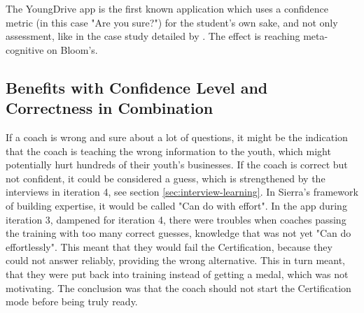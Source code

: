   The YoungDrive app is the first known application which uses a confidence metric (in this case "Are you sure?") for the student's own sake, and not only assessment, like in the case study detailed by \cite{nicol}. The effect is reaching meta-cognitive on Bloom's.





  \subsection{Benefits with Confidence Level and Correctness in Combination}
  If a coach is wrong and sure about a lot of questions, it might be the indication that the coach is teaching the wrong information to the youth, which might potentially hurt hundreds of their youth's businesses. If the coach is correct but not confident, it could be considered a guess, which is strengthened by the interviews in iteration 4, see section \ref{sec:interview-learning}. In Sierra's framework of building expertise, it would be called "Can do with effort". In the app during iteration 3, dampened for iteration 4, there were troubles when coaches passing the training with too many correct guesses, knowledge that was not yet "Can do effortlessly". This meant that they would fail the Certification, because they could not answer reliably, providing the wrong alternative. This in turn meant, that they were put back into training instead of getting a medal, which was not motivating. The conclusion was that the coach should not start the Certification mode before being truly ready.

